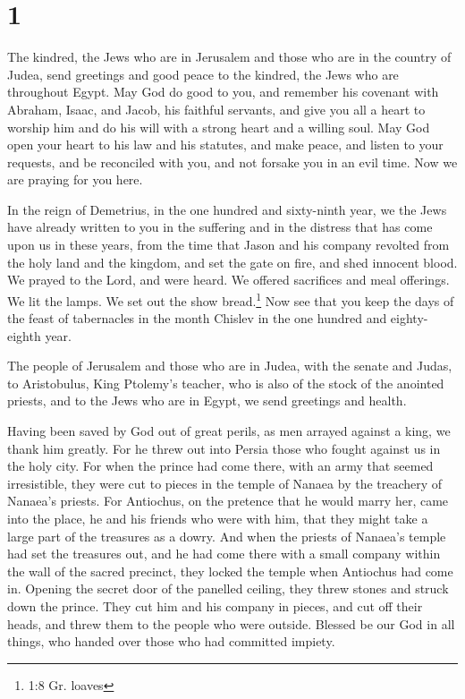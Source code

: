 \hypertarget{section}{%
\section{1}\label{section}}

 The kindred, the Jews who are in Jerusalem and those who
are in the country of Judea, send greetings and good peace to the
kindred, the Jews who are throughout Egypt.  May God do good
to you, and remember his covenant with Abraham, Isaac, and Jacob, his
faithful servants,  and give you all a heart to worship him
and do his will with a strong heart and a willing soul.  May
God open your heart to his law and his statutes, and make peace,
 and listen to your requests, and be reconciled with you,
and not forsake you in an evil time.  Now we are praying for
you here.

 In the reign of Demetrius, in the one hundred and
sixty-ninth year, we the Jews have already written to you in the
suffering and in the distress that has come upon us in these years, from
the time that Jason and his company revolted from the holy land and the
kingdom,  and set the gate on fire, and shed innocent blood.
We prayed to the Lord, and were heard. We offered sacrifices and meal
offerings. We lit the lamps. We set out the show bread.\footnote{1:8 Gr.
  loaves}  Now see that you keep the days of the feast of
tabernacles in the month Chislev in the one hundred and eighty-eighth
year.

 The people of Jerusalem and those who are in Judea, with
the senate and Judas, to Aristobulus, King Ptolemy's teacher, who is
also of the stock of the anointed priests, and to the Jews who are in
Egypt, we send greetings and health.

 Having been saved by God out of great perils, as men
arrayed against a king, we thank him greatly.  For he threw
out into Persia those who fought against us in the holy city.
 For when the prince had come there, with an army that
seemed irresistible, they were cut to pieces in the temple of Nanaea by
the treachery of Nanaea's priests.  For Antiochus, on the
pretence that he would marry her, came into the place, he and his
friends who were with him, that they might take a large part of the
treasures as a dowry.  And when the priests of Nanaea's
temple had set the treasures out, and he had come there with a small
company within the wall of the sacred precinct, they locked the temple
when Antiochus had come in.  Opening the secret door of the
panelled ceiling, they threw stones and struck down the prince. They cut
him and his company in pieces, and cut off their heads, and threw them
to the people who were outside.  Blessed be our God in all
things, who handed over those who had committed impiety.

